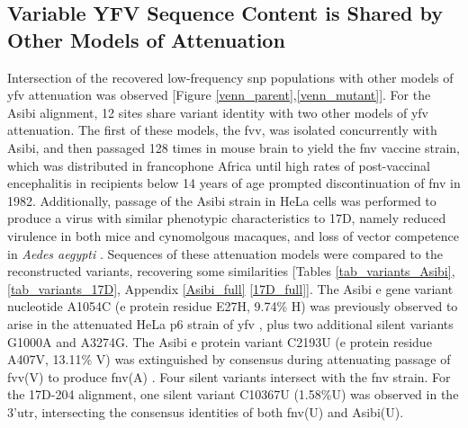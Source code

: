 \subsection{Variable YFV Sequence Content is Shared by Other Models of Attenuation}
Intersection of the recovered low-frequency \gls{snp} populations with other models of \gls{yfv} attenuation was observed [Figure \ref{venn_parent},\ref{venn_mutant}]. For the Asibi alignment, 12 sites share variant identity with two other models of \gls{yfv} attenuation. The first of these models, the \gls{fvv}, was isolated concurrently with Asibi, and then passaged 128 times in mouse brain to yield the \gls{fnv} vaccine strain, which was distributed in francophone Africa until high rates of post-vaccinal encephalitis in recipients below 14 years of age prompted discontinuation of \gls{fnv} in 1982. Additionally, passage of the Asibi strain in HeLa cells was performed to produce a virus with similar phenotypic characteristics to 17D, namely reduced virulence in both mice and cynomolgous macaques, and loss of vector competence in \emph{Aedes aegypti} \parencite{Barrett:1990te,Dunster:1999ij}.
Sequences of these attenuation models were compared to the reconstructed variants, recovering some similarities [Tables \ref{tab_variants_Asibi},\ref{tab_variants_17D}, Appendix \ref{Asibi_full} \ref{17D_full}]. The Asibi \gls{e} gene variant nucleotide A1054C (\gls{e} protein residue E27H, 9.74\% H) was previously observed to arise in the attenuated HeLa p6 strain of \gls{yfv} \parencite{Dunster:1999ij}, plus two additional silent variants G1000A and A3274G. The Asibi \gls{e} protein variant C2193U  (\gls{e} protein residue A407V, 13.11\% V) was extinguished by consensus during attenuating passage of \gls{fvv}(V) to produce \gls{fnv}(A) \parencite{Wang:1995vu}. Four silent variants intersect with the \gls{fnv} strain. For the 17D-204 alignment, one silent variant C10367U (1.58\%U) was observed in the 3'\gls{utr}, intersecting the consensus identities of both \gls{fnv}(U) and Asibi(U).

